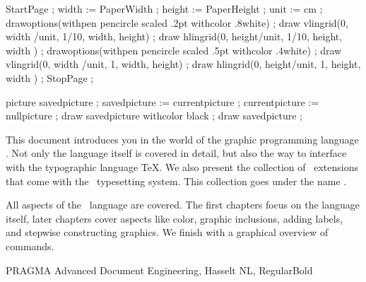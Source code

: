 \startbuffer[gridpage]
\startMPpage
  StartPage ;
    width  := PaperWidth  ; height := PaperHeight ; unit := cm ;
    drawoptions(withpen pencircle scaled .2pt withcolor .8white) ;
    draw vlingrid(0, width /unit, 1/10, width,  height) ;
    draw hlingrid(0, height/unit, 1/10, height, width ) ;
    drawoptions(withpen pencircle scaled .5pt withcolor .4white) ;
    draw vlingrid(0, width /unit, 1,    width,  height) ;
    draw hlingrid(0, height/unit, 1,    height, width ) ;
  StopPage ;
\stopMPpage
\stopbuffer


\startmode[screen]

\startbuffer[wipe]
picture savedpicture ;
savedpicture := currentpicture ;
currentpicture := nullpicture ;
draw savedpicture withcolor black ;
draw savedpicture ;
\stopbuffer

\stopmode

\startnotmode[screen]

\startbuffer[wipe]
\stopbuffer

\stopnotmode

\startbuffer[backtext]

    This document introduces you in the world of the graphic programming language
    \MetaPost. Not only the language itself is covered in detail, but also the way to
    interface with the typographic language \TeX. We also present the collection of
    \MetaPost\ extensions that come with the \ConTeXt\ typesetting system. This
    collection goes under the name \MetaFun.

    \blank

    All aspects of the \MetaPost\ language are covered. The first chapters focus on
    the language itself, later chapters cover aspects like color, graphic
    inclusions, adding labels, and stepwise constructing graphics. We finish with a
    graphical overview of commands.

\stopbuffer

\startbuffer[backbanner]

  \WidthSpanningText
    {PRAGMA Advanced Document Engineering, Hasselt NL, \currentdate[year]}
    {\hsize}
    {RegularBold}

\stopbuffer

\stopenvironment

